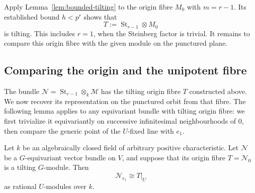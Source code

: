 Apply Lemma~\ref{lem:bounded-tilting} to the origin fibre $M_0$ with
$m=r-1$.  Its established bound $h<p^r$ shows that
\[
 T:=\operatorname{St}_{r-1}\otimes M_0
\]
is tilting.  This includes $r=1$, when the Steinberg factor is trivial.
It remains to compare this origin fibre with the given module on the
punctured plane.

\subsection{Comparing the origin and the unipotent fibre}
\label{subsec:formal-comparison}

The bundle $\mathcal N=\operatorname{St}_{r-1}\otimes_k\mathcal M$
has the tilting origin fibre $T$ constructed above.  We now recover its
representation on the punctured orbit from that fibre.  The following
lemma applies to any equivariant bundle with tilting origin fibre:
we first trivialize it equivariantly on successive infinitesimal
neighbourhoods of $0$, then compare the generic point of the $U$-fixed
line with $e_1$.

\begin{lemma}
\label{lem:formal-comparison}
Let $k$ be an algebraically closed field of arbitrary positive
characteristic.  Let $\mathcal N$ be a $G$-equivariant vector bundle on $V$,
and suppose that its origin fibre $T=\mathcal N_0$ is a tilting
$G$-module.  Then
\[
 \mathcal N_{e_1}\cong T|_U
\]
as rational $U$-modules over $k$.
\end{lemma}

